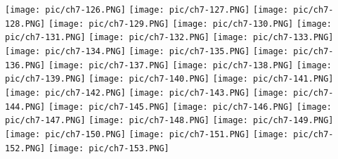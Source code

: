 \documentclass[UTF-8]{ctexart}
\begin{document}
\begin{center}
    \texttt{[image: pic/ch7-126.PNG]}
    \texttt{[image: pic/ch7-127.PNG]}
    \texttt{[image: pic/ch7-128.PNG]}
    \texttt{[image: pic/ch7-129.PNG]}
    \texttt{[image: pic/ch7-130.PNG]}
    \texttt{[image: pic/ch7-131.PNG]}
    \texttt{[image: pic/ch7-132.PNG]}
    \texttt{[image: pic/ch7-133.PNG]}
    \texttt{[image: pic/ch7-134.PNG]}
    \texttt{[image: pic/ch7-135.PNG]}
    \texttt{[image: pic/ch7-136.PNG]}
    \texttt{[image: pic/ch7-137.PNG]}
    \texttt{[image: pic/ch7-138.PNG]}
    \texttt{[image: pic/ch7-139.PNG]}
    \texttt{[image: pic/ch7-140.PNG]}
    \texttt{[image: pic/ch7-141.PNG]}
    \texttt{[image: pic/ch7-142.PNG]}
    \texttt{[image: pic/ch7-143.PNG]}
    \texttt{[image: pic/ch7-144.PNG]}
    \texttt{[image: pic/ch7-145.PNG]}
    \texttt{[image: pic/ch7-146.PNG]}
    \texttt{[image: pic/ch7-147.PNG]}
    \texttt{[image: pic/ch7-148.PNG]}
    \texttt{[image: pic/ch7-149.PNG]}
    \texttt{[image: pic/ch7-150.PNG]}
    \texttt{[image: pic/ch7-151.PNG]}
    \texttt{[image: pic/ch7-152.PNG]}
    \texttt{[image: pic/ch7-153.PNG]}
\end{center}
\end{document}
